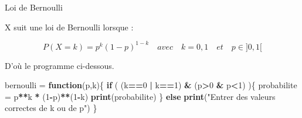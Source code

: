 \documentclass[
  ignorenonframetext,
]{beamer}
\newenvironment{Shaded}{\begin{snugshade}}{\end{snugshade}}
\newcommand{\ControlFlowTok}[1]{\textcolor[rgb]{0.13,0.29,0.53}{\textbf{#1}}}
\newcommand{\DecValTok}[1]{\textcolor[rgb]{0.00,0.00,0.81}{#1}}
\newcommand{\FunctionTok}[1]{\textcolor[rgb]{0.13,0.29,0.53}{\textbf{#1}}}
\newcommand{\NormalTok}[1]{#1}
\newcommand{\OtherTok}[1]{\textcolor[rgb]{0.56,0.35,0.01}{#1}}
\newcommand{\SpecialCharTok}[1]{\textcolor[rgb]{0.81,0.36,0.00}{\textbf{#1}}}
\newcommand{\StringTok}[1]{\textcolor[rgb]{0.31,0.60,0.02}{#1}}
\begin{document}
\begin{frame}[fragile]{Loi de Bernoulli}
\protect\hypertarget{loi-de-bernouilli}{}

X suit une loi de Bernoulli lorsque :

\[P(X=k) = p^k (1-p)^{1-k} \quad avec \quad  k=0,1 \quad et \quad p \in ]0,1[\]

D'où le programme ci-dessous.

\begin{Shaded}
\begin{Highlighting}[]
\NormalTok{bernoulli }\OtherTok{=} \ControlFlowTok{function}\NormalTok{(p,k)\{}
  \ControlFlowTok{if}\NormalTok{ ( (k}\SpecialCharTok{==}\DecValTok{0} \SpecialCharTok{|}\NormalTok{ k}\SpecialCharTok{==}\DecValTok{1}\NormalTok{) }\SpecialCharTok{\&}\NormalTok{ (p}\SpecialCharTok{\textgreater{}}\DecValTok{0} \SpecialCharTok{\&}\NormalTok{ p}\SpecialCharTok{\textless{}}\DecValTok{1}\NormalTok{) )\{}
\NormalTok{        probabilite }\OtherTok{=}\NormalTok{ p}\SpecialCharTok{**}\NormalTok{k }\SpecialCharTok{*}\NormalTok{ (}\DecValTok{1}\SpecialCharTok{{-}}\NormalTok{p)}\SpecialCharTok{**}\NormalTok{(}\DecValTok{1}\SpecialCharTok{{-}}\NormalTok{k)}
        \FunctionTok{print}\NormalTok{(probabilite)}
\NormalTok{  \} }\ControlFlowTok{else}
    \FunctionTok{print}\NormalTok{(}\StringTok{"Entrer des valeurs correctes de k ou de p"}\NormalTok{)}
\NormalTok{\}}
\end{Highlighting}
\end{Shaded}
\end{frame}
\end{document}
